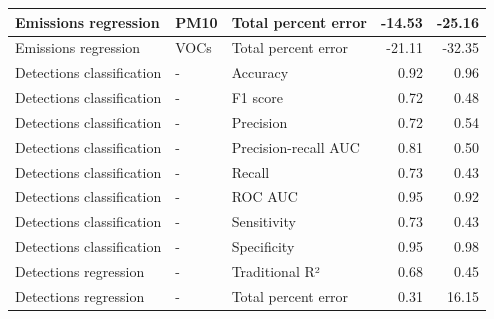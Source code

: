 \begin{table}[!h]
\begin{tabular}[t]{l|l|l|r|r}
Emissions regression & PM10 & Total percent error & -14.53 & -25.16\\
\hline
Emissions regression & VOCs & Total percent error & -21.11 & -32.35\\
\hline
Detections classification & - & Accuracy & 0.92 & 0.96\\
\hline
Detections classification & - & F1 score & 0.72 & 0.48\\
\hline
Detections classification & - & Precision & 0.72 & 0.54\\
\hline
Detections classification & - & Precision-recall AUC & 0.81 & 0.50\\
\hline
Detections classification & - & Recall & 0.73 & 0.43\\
\hline
Detections classification & - & ROC AUC & 0.95 & 0.92\\
\hline
Detections classification & - & Sensitivity & 0.73 & 0.43\\
\hline
Detections classification & - & Specificity & 0.95 & 0.98\\
\hline
Detections regression & - & Traditional R² & 0.68 & 0.45\\
\hline
Detections regression & - & Total percent error & 0.31 & 16.15\\
\hline
\end{tabular}
\end{table}
